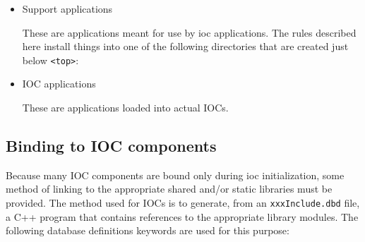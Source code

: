\begin{itemize}
\item Support applications

These are applications meant for use by ioc applications. The rules described here install things into one of the 
following directories that are created just below \verb|<top>|:


\item IOC applications

These are applications loaded into actual IOCs.

\end{itemize}

\subsection{Binding to IOC components}

Because many IOC components are bound only during ioc initialization, some method of linking to the appropriate shared 
and/or static libraries must be provided. The method used for IOCs is to generate, from an \verb|xxxInclude.dbd| file, a C++ 
program that contains references to the appropriate library modules. The following database definitions keywords are used 
for this purpose:

